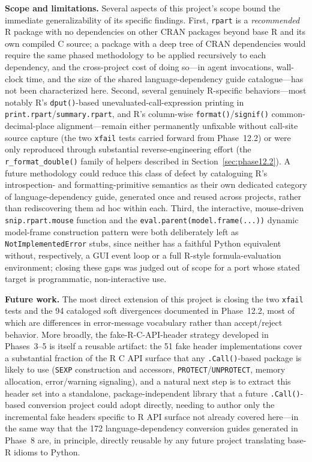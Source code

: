 \documentclass[12pt]{article}
\begin{document}
\textbf{Scope and limitations.} Several aspects of this project's scope bound the immediate generalizability of its specific findings. First, \texttt{rpart} is a \emph{recommended} R package with no dependencies on other CRAN packages beyond base R and its own compiled C source; a package with a deep tree of CRAN dependencies would require the same phased methodology to be applied recursively to each dependency, and the cross-project cost of doing so---in agent invocations, wall-clock time, and the size of the shared language-dependency guide catalogue---has not been characterized here. Second, several genuinely R-specific behaviors---most notably R's \texttt{dput()}-based unevaluated-call-expression printing in \texttt{print.rpart}/\texttt{summary.rpart}, and R's column-wise \texttt{format()}/\texttt{signif()} common-decimal-place alignment---remain either permanently unfixable without call-site source capture (the two \texttt{xfail} tests carried forward from Phase~12.2) or were only reproduced through substantial reverse-engineering effort (the \texttt{r\_format\_double()} family of helpers described in Section~\ref{sec:phase12.2}). A future methodology could reduce this class of defect by cataloguing R's introspection- and formatting-primitive semantics as their own dedicated category of language-dependency guide, generated once and reused across projects, rather than rediscovering them ad hoc within each. Third, the interactive, mouse-driven \texttt{snip.rpart.mouse} function and the \texttt{eval.parent(model.frame(...))} dynamic model-frame construction pattern were both deliberately left as \texttt{NotImplementedError} stubs, since neither has a faithful Python equivalent without, respectively, a GUI event loop or a full R-style formula-evaluation environment; closing these gaps was judged out of scope for a port whose stated target is programmatic, non-interactive use.

\textbf{Future work.} The most direct extension of this project is closing the two \texttt{xfail} tests and the 94 cataloged soft divergences documented in Phase~12.2, most of which are differences in error-message vocabulary rather than accept/reject behavior. More broadly, the fake-R-C-API-header strategy developed in Phases~3--5 is itself a reusable artifact: the 51 fake header implementations cover a substantial fraction of the R C API surface that any \texttt{.Call()}-based package is likely to use (\texttt{SEXP} construction and accessors, \texttt{PROTECT}/\texttt{UNPROTECT}, memory allocation, error/warning signaling), and a natural next step is to extract this header set into a standalone, package-independent library that a future \texttt{.Call()}-based conversion project could adopt directly, needing to author only the incremental fake headers specific to R API surface not already covered here---in the same way that the 172 language-dependency conversion guides generated in Phase~8 are, in principle, directly reusable by any future project translating base-R idioms to Python.
\end{document}
